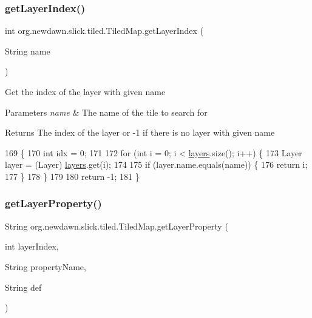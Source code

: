 \subsubsection{\texorpdfstring{get\+Layer\+Index()}{getLayerIndex()}}
{\footnotesize\ttfamily int org.\+newdawn.\+slick.\+tiled.\+Tiled\+Map.\+get\+Layer\+Index (\begin{DoxyParamCaption}\item[{String}]{name }\end{DoxyParamCaption})\hspace{0.3cm}{\ttfamily [inline]}}

Get the index of the layer with given name


\begin{DoxyParams}{Parameters}
{\em name} & The name of the tile to search for \\
\hline
\end{DoxyParams}
\begin{DoxyReturn}{Returns}
The index of the layer or -\/1 if there is no layer with given name 
\end{DoxyReturn}

\begin{DoxyCode}
169                                           \{
170         \textcolor{keywordtype}{int} idx = 0;
171 
172         \textcolor{keywordflow}{for} (\textcolor{keywordtype}{int} i = 0; i < \mbox{\hyperlink{classorg_1_1newdawn_1_1slick_1_1tiled_1_1_tiled_map_a33061324d017a4cd8f41d04e0c60ac27}{layers}}.size(); i++) \{
173             Layer layer = (Layer) \mbox{\hyperlink{classorg_1_1newdawn_1_1slick_1_1tiled_1_1_tiled_map_a33061324d017a4cd8f41d04e0c60ac27}{layers}}.get(i);
174 
175             \textcolor{keywordflow}{if} (layer.name.equals(name)) \{
176                 \textcolor{keywordflow}{return} i;
177             \}
178         \}
179 
180         \textcolor{keywordflow}{return} -1;
181     \}
\end{DoxyCode}
\mbox{\label{classorg_1_1newdawn_1_1slick_1_1tiled_1_1_tiled_map_a3d0f5d0eab64ef750d18721530e3a43c}} 
\subsubsection{\texorpdfstring{get\+Layer\+Property()}{getLayerProperty()}}
{\footnotesize\ttfamily String org.\+newdawn.\+slick.\+tiled.\+Tiled\+Map.\+get\+Layer\+Property (\begin{DoxyParamCaption}\item[{int}]{layer\+Index,  }\item[{String}]{property\+Name,  }\item[{String}]{def }\end{DoxyParamCaption})\hspace{0.3cm}{\ttfamily [inline]}}

